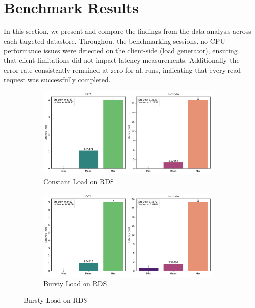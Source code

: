 \section{Benchmark Results}
\label{cha:results}

In this section, we present and compare the findings from the data analysis across each targeted datastore. Throughout the benchmarking sessions, no CPU performance issues were detected on the client-side (load generator), ensuring that client limitations did not impact latency measurements. Additionally, the error rate consistently remained at zero for all runs, indicating that every read request was successfully completed.

\begin{figure}[h]
	\begin{subfigure}{0.49\linewidth}
		\centering
		\includegraphics[width=\linewidth]{./fig/bar-rds-constant.pdf}
		\caption{Constant Load on RDS}
		\label{fig:bar_rds_const}
	\end{subfigure}
	\hfill
	\begin{subfigure}{0.49\linewidth}
		\centering
		\includegraphics[width=\linewidth]{./fig/bar-rds-bursty.pdf}
		\caption{Bursty Load on RDS}
		\label{fig:bar_rds_bursty}
	\end{subfigure}

\end{figure}
